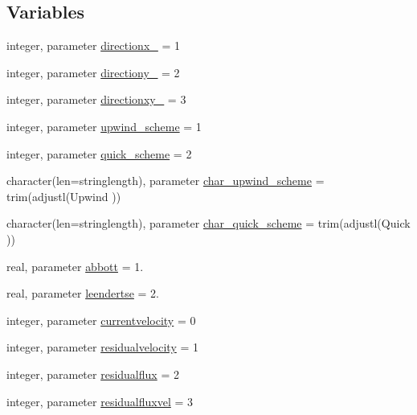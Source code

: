 \subsection*{Variables}
\begin{DoxyCompactItemize}
\item 
integer, parameter \mbox{\hyperlink{namespacemodulehydrodynamic_a67c3eb176a7e951a6d581c55fd3abe6b}{directionx\+\_\+}} = 1
\item 
integer, parameter \mbox{\hyperlink{namespacemodulehydrodynamic_a2f8213ce2a7db4198f421082f6047325}{directiony\+\_\+}} = 2
\item 
integer, parameter \mbox{\hyperlink{namespacemodulehydrodynamic_a1ad3170dbb160b604cb87024937cbb69}{directionxy\+\_\+}} = 3
\item 
integer, parameter \mbox{\hyperlink{namespacemodulehydrodynamic_abfec894219e1481b4825496dc98bfcf2}{upwind\+\_\+scheme}} = 1
\item 
integer, parameter \mbox{\hyperlink{namespacemodulehydrodynamic_a2a271d48aec2bf3160e26e6c6f89c67c}{quick\+\_\+scheme}} = 2
\item 
character(len=stringlength), parameter \mbox{\hyperlink{namespacemodulehydrodynamic_a828b31b29ee1dca289591bf9a36269e2}{char\+\_\+upwind\+\_\+scheme}} = trim(adjustl(\textquotesingle{}Upwind\textquotesingle{} ))
\item 
character(len=stringlength), parameter \mbox{\hyperlink{namespacemodulehydrodynamic_a4962eb3adfe61c30169233514394ab77}{char\+\_\+quick\+\_\+scheme}} = trim(adjustl(\textquotesingle{}Quick\textquotesingle{} ))
\item 
real, parameter \mbox{\hyperlink{namespacemodulehydrodynamic_a62654119689cd77c2b08514d7755b1b7}{abbott}} = 1.
\item 
real, parameter \mbox{\hyperlink{namespacemodulehydrodynamic_aeef650d7f61a5804ed5e66de705d43f1}{leendertse}} = 2.
\item 
integer, parameter \mbox{\hyperlink{namespacemodulehydrodynamic_a867e0a4829c59e0b2e02ed581005a9f7}{currentvelocity}} = 0
\item 
integer, parameter \mbox{\hyperlink{namespacemodulehydrodynamic_a8e04bbcc49d7b72be4c3907153cd11c0}{residualvelocity}} = 1
\item 
integer, parameter \mbox{\hyperlink{namespacemodulehydrodynamic_a977ab324d6c78f9961e3b3498072be28}{residualflux}} = 2
\item 
integer, parameter \mbox{\hyperlink{namespacemodulehydrodynamic_abf8de9c99f5fa9bed67982723ae76bcb}{residualfluxvel}} = 3

\end{DoxyCompactItemize}
